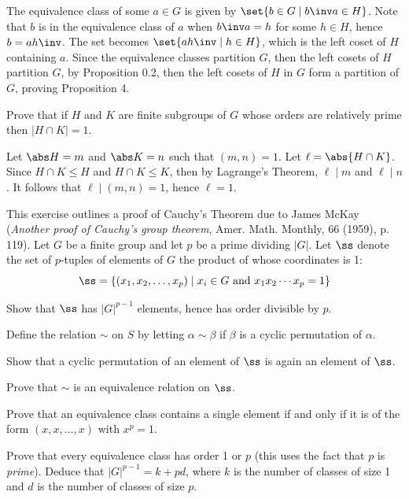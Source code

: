 \begin{problems}
\begin{sol}
        The equivalence class of some $a \in G$ is given by $\set{b \in G \mid b\inv a \in H}$. Note that $b$ is in the equivalence class of $a$ when $b\inv a = h$ for some $h \in H$, hence $b = ah\inv$. The set becomes $\set{ah\inv \mid h \in H}$, which is the left coset of $H$ containing $a$. Since the equivalence classes partition $G$, then the left cosets of $H$ partition $G$, by Proposition 0.2, then the left cosets of $H$ in $G$ form a partition of $G$, proving Proposition 4.
    \end{sol}
    \item Prove that if $H$ and $K$ are finite subgroups of $G$ whose orders are relatively prime then $|H \cap K| = 1$.
    \begin{sol}
        Let $\abs H = m$ and $\abs K = n$ such that $(m, n) = 1$. Let $\ell = \abs{H \cap K}$. Since $H \cap K \leq H$ and $H \cap K \leq K$, then by Lagrange's Theorem, $\ell \mid m$ and $\ell \mid n$. It follows that $\ell \mid (m, n) = 1$, hence $\ell = 1$.
    \end{sol}
    \item This exercise outlines a proof of Cauchy's Theorem due to James McKay (\textit{Another proof of Cauchy's group theorem}, Amer. Math. Monthly, 66 (1959), p. 119). Let $G$ be a finite group and let $p$ be a prime dividing $|G|$. Let $\ss$ denote the set of $p$-tuples of elements of $G$ the product of whose coordinates is 1:
    \[\ss = \{(x_1, x_2, \ldots, x_p) \mid x_i \in G \text{ and } x_1x_2 \cdots x_p = 1\}\]
    \begin{problems}
        \item Show that $\ss$ has $|G|^{p-1}$ elements, hence has order divisible by $p$.
    \end{problems}
    Define the relation $\sim$ on $S$ by letting $\alpha \sim \beta$ if $\beta$ is a cyclic permutation of $\alpha$.
    \begin{problems}[resume]
        \item Show that a cyclic permutation of an element of $\ss$ is again an element of $\ss$.
        \item Prove that $\sim$ is an equivalence relation on $\ss$.
        \item Prove that an equivalence class contains a single element if and only if it is of the form $(x, x, \dots, x)$ with $x^p = 1$.
        \item Prove that every equivalence class has order 1 or $p$ (this uses the fact that $p$ is \textit{prime}). Deduce that $|G|^{p-1} = k + pd$, where $k$ is the number of classes of size 1 and $d$ is the number of classes of size $p$.

\end{problems}
\end{problems}

